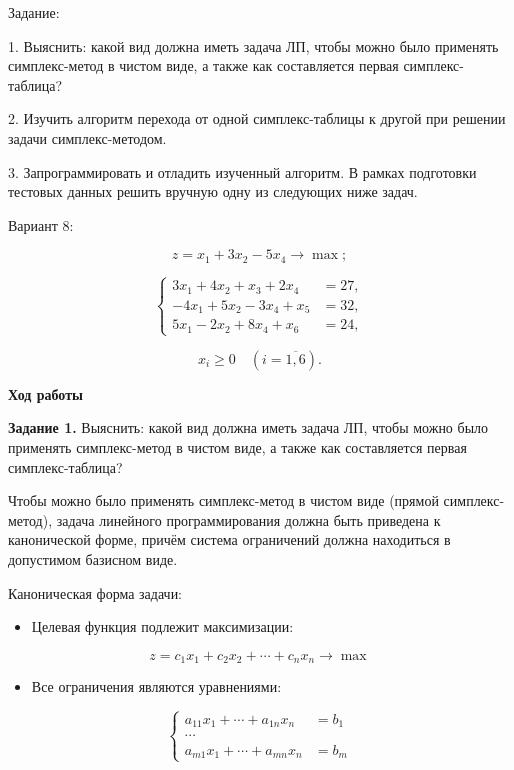 \documentclass[a4paper,14pt]{extarticle}
\begin{document}
Задание:

1. Выяснить: какой вид должна иметь задача ЛП, чтобы можно было
применять симплекс-метод в чистом виде, а также как составляется
первая симплекс-таблица?

2. Изучить алгоритм перехода от одной симплекс-таблицы к другой
при решении задачи симплекс-методом.

3. Запрограммировать и отладить изученный алгоритм. В рамках
подготовки тестовых данных решить вручную одну из следующих
ниже задач.

Вариант 8:

\vspace{1cm}

\[
z = x_1 + 3x_2 - 5x_4 \rightarrow \max;
\]

\[
\left\{
\begin{aligned}
3x_1 + 4x_2 + x_3 + 2x_4 &= 27,\\
-4x_1 + 5x_2 - 3x_4 + x_5 &= 32,\\
5x_1 - 2x_2 + 8x_4 + x_6 &= 24,
\end{aligned}
\right.
\]

\[
x_i \geq 0 \quad (i=\overline{1,6}).
\]

\vspace{0.5cm}
\newpage
\textbf{Ход работы}

\textbf{Задание 1.} Выяснить: какой вид должна иметь задача ЛП, чтобы можно было
применять симплекс-метод в чистом виде, а также как составляется
первая симплекс-таблица?

Чтобы можно было применять симплекс-метод в чистом виде (прямой симплекс-метод), задача линейного программирования должна быть приведена к канонической форме, причём система ограничений должна находиться в допустимом базисном виде.

Каноническая форма задачи:

\begin{itemize}
\item Целевая функция подлежит максимизации:
\end{itemize}

\[
z=c_1 x_1+c_2 x_2+\cdots+c_n x_n\rightarrow\max
\]

\begin{itemize}
\item Все ограничения являются уравнениями:
\end{itemize}

\[
\left\{
\begin{aligned}
a_{11}x_1+\cdots+a_{1n}x_n&=b_1\\
\cdots \\
a_{m1}x_1+\cdots+a_{mn}x_n&=b_m
\end{aligned}
\right.
\]
\end{document}

